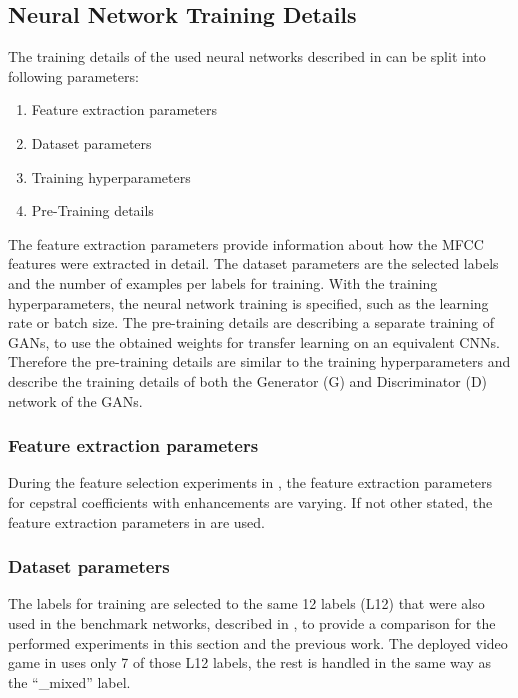 
\subsection{Neural Network Training Details}\label{sec:exp_details_training}
The training details of the used neural networks described in  can be split into following parameters:
\begin{enumerate}
  \item Feature extraction parameters
  \item Dataset parameters
  \item Training hyperparameters
  \item Pre-Training details
\end{enumerate}
The feature extraction parameters provide information about how the MFCC features were extracted in detail.
The dataset parameters are the selected labels and the number of examples per labels for training.
With the training hyperparameters, the neural network training is specified, such as the learning rate or batch size.
The pre-training details are describing a separate training of GANs, to use the obtained weights for transfer learning on an equivalent CNNs.
Therefore the pre-training details are similar to the training hyperparameters and describe the training details of both the Generator (G) and Discriminator (D) network of the GANs.



\subsubsection{Feature extraction parameters}
During the feature selection experiments in , the feature extraction parameters for cepstral coefficients with enhancements are varying.
If not other stated, the feature extraction parameters in  are used.




\subsubsection{Dataset parameters}
The labels for training are selected to the same 12 labels (L12) that were also used in the benchmark networks, described in , to provide a comparison for the performed experiments in this section and the previous work.
The deployed video game in  uses only 7 of those L12 labels, the rest is handled in the same way as the \enquote{\_mixed} label.


